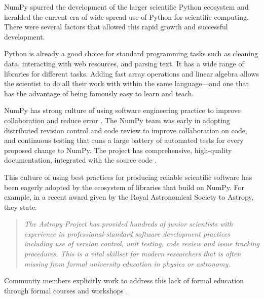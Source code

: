
NumPy spurred the development of the larger scientific Python ecosystem and
heralded the current era of wide-spread use of Python for scientific computing.
There were several factors that allowed this rapid growth and successful
development.

Python is already a good choice for standard programming tasks such as
cleaning data, interacting with web resources, and parsing text.
It has a wide range of libraries for different tasks.
Adding fast array operations and linear algebra allows the scientist to do all
their work with within the same language---and one that has the advantage of
being famously easy to learn and teach.

NumPy has strong culture of using software engineering practice to
improve collaboration and reduce error \cite{millman2014developing}.
The NumPy team was early in adopting distributed revision control and code
review to improve collaboration on code, and continuous testing that runs a
large battery of automated tests for every proposed change to NumPy.
The project has comprehensive, high-quality documentation, integrated with the
source code \cite{vanderwalt2008scipy,harrington2008scipy,harrington2009scipy}.


This culture of using best practices for producing reliable scientific software
has been eagerly adopted by the ecosystem of libraries that build on NumPy.
For example, in a recent award given by the Royal Astronomical Society to
Astropy, they state:
\begin{quotation}
\noindent\emph{The Astropy Project has provided hundreds of junior scientists
with experience in professional-standard software development practices
including use of version control, unit testing, code review and issue tracking
procedures. This is a vital skillset for modern researchers that is often
missing from formal university education in physics or astronomy.}
\end{quotation}
Community members explicitly work to address this lack of formal education
through formal courses and workshops
\cite{wilson-software-carpentry,hannay-scientific-software-survey,millman2018teaching}.

